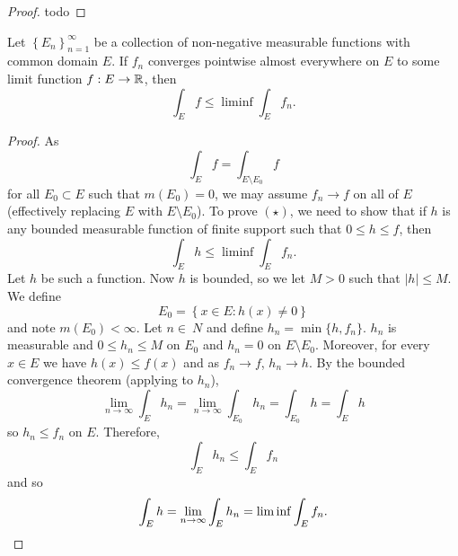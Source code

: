 \begin{proof}
	todo %
\end{proof}

\begin{lemma}
	Let
	$
		\left\{
			E_n
		\right\}_{n=1}^\infty
	$
	be a collection of non-negative measurable functions
	with common domain $E$.
	If $f_n$ converges pointwise almost everywhere on $E$
	to some limit function $f:E \to \mathbb{R}$, then
	\[
		\int_E f \leq \liminf \int_E f_n. \tag{$\star$}
	\]
\end{lemma}

\begin{proof}
	As
	\[
		\int_E f = \int_{E \setminus E_0} f
	\]
	for all $E_0 \subset E$ such that $m(E_0) = 0$,
	we may assume $f_n \to f$ on all of $E$
	(effectively replacing $E$ with $E \setminus E_0$).
	To prove $(\star)$, we need to show that if $h$ is any
	bounded measurable function of finite support such that 
	$0 \leq h \leq f$, then
	\[
		\int_E h \leq \liminf \int_E f_n.
	\]
	Let $h$ be such a function.
	Now $h$ is bounded, so we let $M > 0$ such that 
	$\left\lvert h \right\rvert \leq M$.
	We define
	\[
		E_0 = \left\{
			x \in E: h(x) \neq 0
		\right\}
	\]
	and note $m(E_0) < \infty$.
	Let $n \in\ N$ and define
	$
		h_n = \min\{h, f_n\}
	$.
	$h_n$ is measurable and $0 \leq h_n \leq M$ on $E_0$
	and $h_n = 0$ on $E \setminus E_0$.
	Moreover, for every $x \in E$ we have $h(x) \leq f(x)$
	and as $f_n \to f$, $h_n \to h$.
	By the bounded convergence theorem (applying to $h_n$),
	\[
		\lim_{n \to \infty} \int_E h_n
		= \lim_{n \to \infty} \int_{E_0} h_n
		= \int_{E_0} h
		= \int_E h
	\]
	so $h_n \leq f_n$ on $E$.
	Therefore,
	\[
		\int_E h_n \leq \int_E f_n
	\]
	and so 
	\[
		\int_E h 
		= \lim_{n \to \infty} \int_E h_n
		= \liminf \int_E f_n. \qedhere
	\]
\end{proof}

